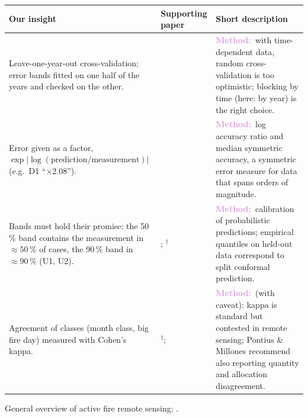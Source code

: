 \documentclass[10pt,a4paper]{article}
\newcommand{\fitlabel}[2]{\textcolor{#1}{\textbf{#2}}}
\newcommand{\method}{\fitlabel{Plum}{Method:}}
\newcommand{\abs}{$^\dagger$}   %
\newenvironment{insighttable}{%
  \small
  \begin{longtable}{L{0.36\textwidth} L{0.17\textwidth} L{0.41\textwidth}}
  \toprule
  \textbf{Our insight} & \textbf{Supporting paper} & \textbf{Short description} \\
  \midrule
  \endhead
  \bottomrule
  \endfoot
}{%
  \end{longtable}
}
\begin{document}
\begin{insighttable}
Leave-one-year-out cross-validation; error bands fitted on one half of the years and checked on the other.
& \citet{roberts2017}
& \method\ with time-dependent data, random cross-validation is too optimistic; blocking by time (here: by year)
is the right choice. \\

Error given as a factor, $\exp\left|\log(\text{prediction}/\text{measurement})\right|$ (e.g.\ D1 ``$\times 2.08$'').
& \citet{morley2018}
& \method\ log accuracy ratio and median symmetric accuracy, a symmetric error measure for data that spans
orders of magnitude. \\

Bands must hold their promise: the 50\,\% band contains the measurement in $\approx 50$\,\% of cases, the 90\,\% band
in $\approx 90$\,\% (U1, U2).
& \citet{gneiting2007}; \citet{lei2018}\abs
& \method\ calibration of probabilistic predictions; empirical quantiles on held-out data correspond to split
conformal prediction. \\

Agreement of classes (month class, big fire day) measured with Cohen's kappa.
& \citet{cohen1960}\abs; \citet{pontius2011}
& \method\ (with caveat): kappa is standard but contested in remote sensing; Pontius \& Millones recommend
also reporting quantity and allocation disagreement. \\
\end{insighttable}

\noindent
General overview of active fire remote sensing: \citet{wooster2021}.



\end{document}
